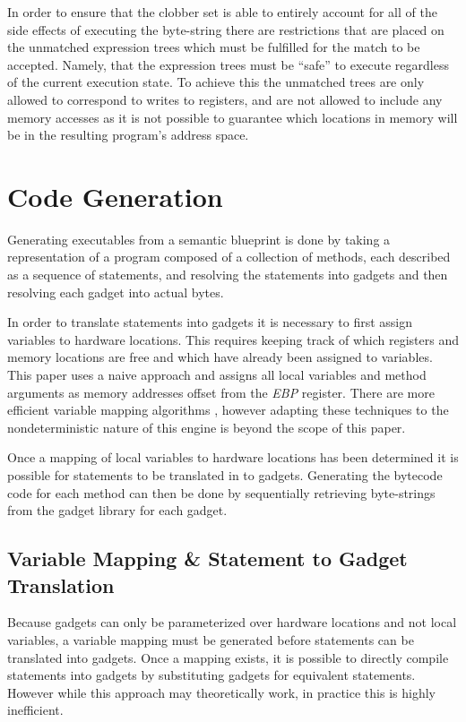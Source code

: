     In order to ensure that the clobber set is able to entirely account for all
    of the side effects of executing the byte-string there are restrictions that
    are placed on the unmatched expression trees which must be fulfilled for the
    match to be accepted. Namely, that the expression trees must be ``safe'' to
    execute regardless of the current execution state. To achieve this the
    unmatched trees are only allowed to correspond to writes to registers, and
    are not allowed to include any memory accesses as it is not possible to
    guarantee which locations in memory will be in the resulting program's
    address space.

    \section{Code Generation}

    Generating executables from a semantic blueprint is done by taking a
    representation of a program composed of a collection of methods, each
    described as a sequence of statements, and resolving the statements into
    gadgets and then resolving each gadget into actual bytes.

    In order to translate statements into gadgets it is necessary to first
    assign variables to hardware locations. This requires keeping track of which
    registers and memory locations are free and which have already been assigned
    to variables.  This paper uses a naive approach and assigns all local
    variables and method arguments as memory addresses offset from the
    \emph{EBP} register. There are more efficient variable mapping algorithms
    \cite{register-coloring,register-iterate}, however adapting these techniques
    to the nondeterministic nature of this engine is beyond the scope of this
    paper.
    
    Once a mapping of local variables to hardware locations has been determined
    it is possible for statements to be translated in to gadgets. Generating the
    bytecode code for each method can then be done by sequentially retrieving
    byte-strings from the gadget library for each gadget. 

    \subsection{Variable Mapping \& Statement to Gadget Translation}

    Because gadgets can only be parameterized over hardware locations and not
    local variables, a variable mapping must be generated before statements can
    be translated into gadgets. Once a mapping exists, it is possible to
    directly compile statements into gadgets by substituting gadgets for
    equivalent statements. However while this approach may theoretically work,
    in practice this is highly inefficient.
    
